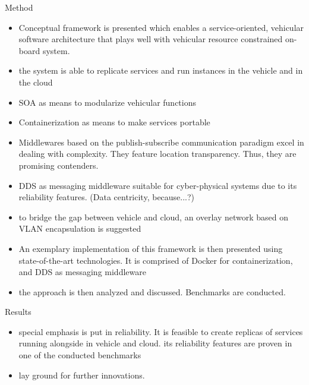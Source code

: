Method
\begin{itemize}
\item  Conceptual framework is presented which enables a service-oriented, vehicular software architecture that plays well with vehicular resource constrained on-board system.
\item the system is able to replicate services and run instances in the vehicle and in the cloud
\item SOA as means to modularize vehicular functions 
\item Containerization as means to make services portable
\item Middlewares based on the publish-subscribe communication paradigm excel in dealing with complexity. They feature location transparency. Thus, they are promising contenders. 
\item DDS as messaging middleware suitable for cyber-physical systems due to its reliability features. (Data centricity, because...?)
\item to bridge the gap between vehicle and cloud, an overlay network based on VLAN encapsulation is suggested
\item  An exemplary implementation of this framework is then presented using state-of-the-art technologies. It is comprised of Docker for containerization, and DDS as messaging middleware
\item the approach is then analyzed and discussed. Benchmarks are conducted.
\end{itemize}


Results
\begin{itemize}
\item special emphasis is put in reliability. It is feasible to create replicas of services running alongside in vehicle and cloud.
its reliability features are proven in one of the conducted benchmarks
\item lay ground for further innovations.
\end{itemize}
